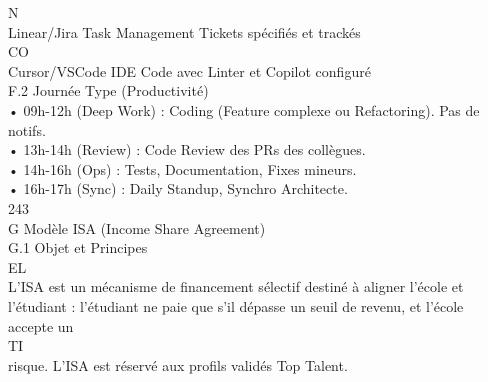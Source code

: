 \documentclass[12pt,landscape,a4paper]{article}
\begin{document}
\vspace{0.5em}
N\\
Linear/Jira     Task Management Tickets spécifiés et trackés\\
CO\\
Cursor/VSCode IDE               Code avec Linter et Copilot configuré\\
\vspace{0.5em}
\vspace{0.5em}
\vspace{0.5em}
F.2 Journée Type (Productivité)\\
• 09h-12h (Deep Work) : Coding (Feature complexe ou Refactoring). Pas de notifs.\\
\vspace{0.5em}
• 13h-14h (Review) : Code Review des PRs des collègues.\\
\vspace{0.5em}
• 14h-16h (Ops) : Tests, Documentation, Fixes mineurs.\\
\vspace{0.5em}
• 16h-17h (Sync) : Daily Standup, Synchro Architecte.\\
\vspace{0.5em}
\vspace{0.5em}
\vspace{0.5em}
\vspace{0.5em}
243\\
G \textbar{} Modèle ISA (Income Share Agreement)\\
\vspace{0.5em}
\vspace{0.5em}
G.1 Objet et Principes\\
\vspace{0.5em}
\vspace{0.5em}
\vspace{0.5em}
\vspace{0.5em}
EL\\
L’ISA est un mécanisme de financement sélectif destiné à aligner l’école et l’étudiant : l’étudiant ne paie que s’il dépasse un seuil de revenu, et l’école accepte un\\
\vspace{0.5em}
\vspace{0.5em}
\vspace{0.5em}
\vspace{0.5em}
TI\\
risque. L’ISA est réservé aux profils validés Top Talent.\\
\vspace{0.5em}
\end{document}
